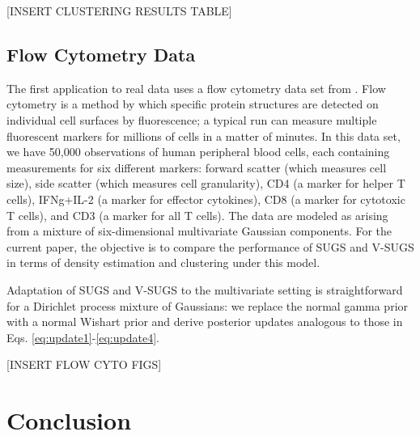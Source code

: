 \documentclass{uwstat572}
\begin{document}
[INSERT CLUSTERING RESULTS TABLE]

\subsection{Flow Cytometry Data}

The first application to real data uses a flow cytometry data set from \cite{manolopoulou}. Flow cytometry is a method by which specific protein structures are detected on individual cell surfaces by fluorescence; a typical run can measure multiple fluorescent markers for millions of cells in a matter of minutes. In this data set, we have 50,000 observations of human peripheral blood cells, each containing measurements for six different markers: forward scatter (which measures cell size), side scatter (which measures cell granularity), CD4 (a marker for helper T cells), IFNg+IL-2 (a marker for effector cytokines), CD8 (a marker for cytotoxic T cells), and CD3 (a marker for all T cells). The data are modeled as arising from a mixture of six-dimensional multivariate Gaussian components. For the current paper, the objective is to compare the performance of SUGS and V-SUGS in terms of density estimation and clustering under this model.

Adaptation of SUGS and V-SUGS to the multivariate setting is straightforward for a Dirichlet process mixture of Gaussians: we replace the normal gamma prior with a normal Wishart prior and derive posterior updates analogous to those in Eqs. \ref{eq:update1}-\ref{eq:update4}. 

[INSERT FLOW CYTO FIGS]

\section{Conclusion}
\end{document}
